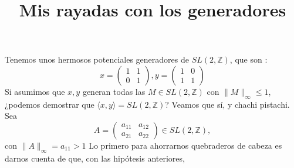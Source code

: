 \documentclass{article}
\title{Mis rayadas con los generadores}
\date{}
\newcommand\tab[1][0.6cm]{\hspace*{#1}}
\newcommand\nl{\newline\tab}
\begin{document}
	\maketitle
	Tenemos unos hermosos potenciales generadores de $ SL(2, \mathbb{Z}) $, que son : 
	$$
	x = 
	\begin{pmatrix}
	1 & 1 \\
	0 & 1 
	\end{pmatrix},	
	y = 
	\begin{pmatrix}
	1 & 0 \\
	1 & 1 
	\end{pmatrix}
	$$
	\nl
	Si asumimos que $x, y$ generan todas las $M \in SL(2, \mathbb{Z}) $ con  $ \| M \|_\infty \leq 1 $, ¿podemos demostrar que $\langle x, y \rangle =  SL(2, \mathbb{Z})$? \nl
	Veamos que sí, y chachi pistachi. 
	Sea $$
	A = 
	\begin{pmatrix}
	a_{11} & a_{12} \\
	a_{21} & a_{22} 
	\end{pmatrix} \in SL(2, \mathbb{Z}), $$ con  $ \| A \|_\infty = a_{11} > 1
	$ \nl 
	Lo primero para ahorrarnos quebraderos de cabeza es darnos cuenta de que, con las hipótesis anteriores,  
	
\end{document}
